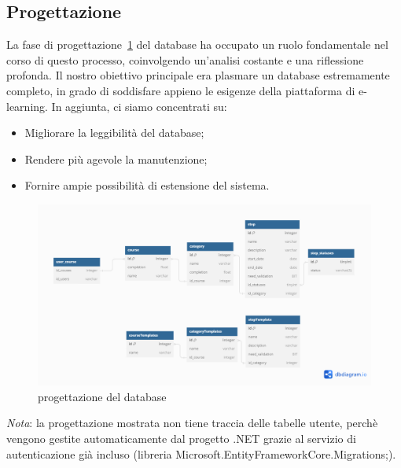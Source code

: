 \subsection{Progettazione}
La fase di progettazione~\ref{fig:one} del database ha occupato un ruolo fondamentale nel corso di 
questo processo, coinvolgendo un'analisi costante e una riflessione profonda. Il nostro 
obiettivo principale era plasmare un database estremamente completo, in grado di 
soddisfare appieno le esigenze della piattaforma di e-learning. In aggiunta, ci siamo 
concentrati su:
\begin{itemize}
	\item Migliorare la leggibilità del database;
	\item Rendere più agevole la manutenzione;
	\item Fornire ampie possibilità di estensione del sistema.
\end{itemize}
\begin{figure}[ht]
	\centering
	\includegraphics[width=1\textwidth]{img/progettazione_database.png}
	\caption{progettazione del database}
	\label{fig:one}
\end{figure}
\textit{Nota}: la progettazione mostrata non tiene traccia delle tabelle utente, perchè vengono 
gestite automaticamente dal progetto .NET grazie al servizio di autenticazione già 
incluso (libreria Microsoft.EntityFrameworkCore.Migrations;). 

